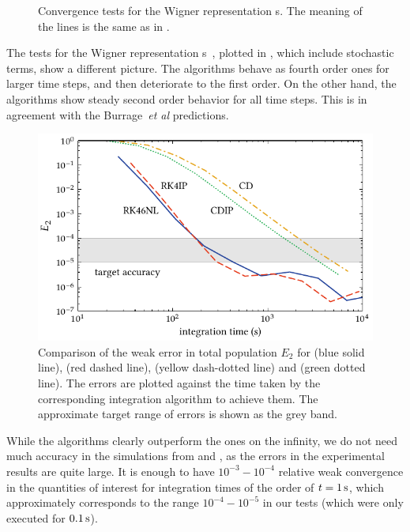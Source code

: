 \begin{figure}
    \caption[Convergence tests, s]{
    Convergence tests for the Wigner representation s.
    The meaning of the lines is the same as in .
    }%

    \label{fig:numerical:convergence-wigner}
\end{figure}

The tests for the Wigner representation s~, plotted in , which include stochastic terms, show a different picture.
The  algorithms behave as fourth order ones for larger time steps, and then deteriorate to the first order.
On the other hand, the  algorithms show steady second order behavior for all time steps.
This is in agreement with the Burrage~\textit{et al} predictions.

\begin{figure}
    \centerline{%
    \includegraphics{figures_generated/test/convergence_by_time.pdf}}%

    \caption[Comparison of integration algorithms]{
    Comparison of the weak error in total population $E_2$ for  (blue solid line),  (red dashed line),  (yellow dash-dotted line) and  (green dotted line).
    The errors are plotted against the time taken by the corresponding integration algorithm to achieve them.
    The approximate target range of errors is shown as the grey band.
    }%

    \label{fig:numerical:convergence-by-time}
\end{figure}

While the  algorithms clearly outperform the  ones on the infinity, we do not need much accuracy in the simulations from  and , as the errors in the experimental results are quite large.
It is enough to have $10^{-3}-10^{-4}$ relative weak convergence in the quantities of interest for integration times of the order of $t=1\mbox{\ensuremath{\,\mathrm{s}}}$, which approximately corresponds to the range $10^{-4}-10^{-5}$ in our tests (which were only executed for $0.1\mbox{\ensuremath{\,\mathrm{s}}}$).

